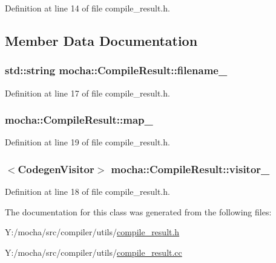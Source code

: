 Definition at line 14 of file compile\_\-result.h.



\subsection{Member Data Documentation}
\hypertarget{classmocha_1_1_compile_result_a69d7f443ef3b2117ea3dfb1029bbd4e8}{
\subsubsection[{filename\_\-}]{\setlength{\rightskip}{0pt plus 5cm}std::string {\bf mocha::CompileResult::filename\_\-}}}
\label{classmocha_1_1_compile_result_a69d7f443ef3b2117ea3dfb1029bbd4e8}


Definition at line 17 of file compile\_\-result.h.

\hypertarget{classmocha_1_1_compile_result_ab04d46e6dd228a05c487abd7c6e23c72}{
\subsubsection[{map\_\-}]{ {\bf mocha::CompileResult::map\_\-}}}
\label{classmocha_1_1_compile_result_ab04d46e6dd228a05c487abd7c6e23c72}


Definition at line 19 of file compile\_\-result.h.

\hypertarget{classmocha_1_1_compile_result_a61362b2f729b2d1b1fb7aa79c4fde52f}{
\subsubsection[{visitor\_\-}]{$<${\bf CodegenVisitor}$>$ {\bf mocha::CompileResult::visitor\_\-}}}
\label{classmocha_1_1_compile_result_a61362b2f729b2d1b1fb7aa79c4fde52f}


Definition at line 18 of file compile\_\-result.h.



The documentation for this class was generated from the following files:\begin{DoxyCompactItemize}
\item 
Y:/mocha/src/compiler/utils/\hyperlink{compile__result_8h}{compile\_\-result.h}\item 
Y:/mocha/src/compiler/utils/\hyperlink{compile__result_8cc}{compile\_\-result.cc}\end{DoxyCompactItemize}
